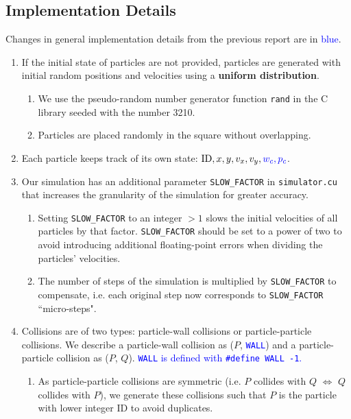 \documentclass[12pt]{article}
\begin{document}
\pagebreak

\subsection{Implementation Details}

Changes in general implementation details from the previous report are in \textcolor{blue}{blue}.

\begin{enumerate}
	\item If the initial state of particles are not provided, particles are generated with initial random positions and velocities using a \textbf{uniform distribution}.
	\begin{enumerate}
		\item We use the pseudo-random number generator function \texttt{rand} in the C library seeded with the number 3210.
		\item Particles are placed randomly in the square without overlapping.
	\end{enumerate}
	\item Each particle keeps track of its own state: $\textrm{ID}, x, y, v_x, v_y, \textcolor{blue}{w_c, p_c}$.
	\item Our simulation has an additional parameter \texttt{SLOW\_FACTOR} in \texttt{simulator.cu} that increases the granularity of the simulation for greater accuracy. \label{slow-factor-ref}
	\begin{enumerate}
		\item Setting \texttt{SLOW\_FACTOR} to an integer $>1$ slows the initial velocities of all particles by that factor. \texttt{SLOW\_FACTOR} should be set to a power of two to avoid introducing additional floating-point errors when dividing the particles’ velocities.
		\item The number of steps of the simulation is multiplied by \texttt{SLOW\_FACTOR} to compensate, i.e. each original step now corresponds to \texttt{SLOW\_FACTOR} ``micro-steps".
	\end{enumerate}
	\item Collisions are of two types: particle-wall collisions or particle-particle collisions. We describe a particle-wall collision as ($P$, \textcolor{blue}{\texttt{WALL}}) and a particle-particle collision as ($P$, $Q$). \textcolor{blue}{\texttt{WALL} is defined with \texttt{\#define WALL -1}.}
	\begin{enumerate}
		\item As particle-particle collisions are symmetric (i.e. $P$ collides with $Q$ $\iff$ $Q$ collides with $P$), we generate these collisions such that $P$ is the particle with lower integer ID to avoid duplicates.

\end{enumerate}
\end{enumerate}
\end{document}

